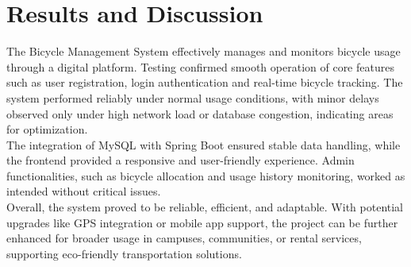 \section{Results and Discussion}
The Bicycle Management System effectively manages and monitors bicycle usage through a digital platform. Testing confirmed smooth operation of core features such as user registration, login authentication and real-time bicycle tracking. The system performed reliably under normal usage conditions, with minor delays observed only under high network load or database congestion, indicating areas for optimization.\\
The integration of MySQL with Spring Boot ensured stable data handling, while the frontend provided a responsive and user-friendly experience. Admin functionalities, such as bicycle allocation and usage history monitoring, worked as intended without critical issues.\\
Overall, the system proved to be reliable, efficient, and adaptable. With potential upgrades like GPS integration or mobile app support, the project can be further enhanced for broader usage in campuses, communities, or rental services, supporting eco-friendly transportation solutions.\cite{3.3}\\

